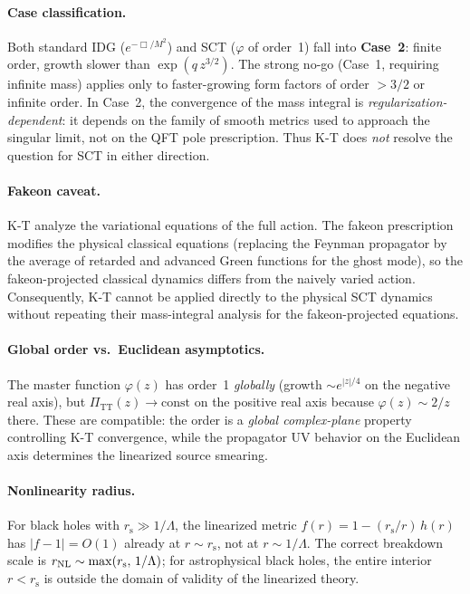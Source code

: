 \documentclass[11pt,a4paper]{article}
\theoremstyle{definition}
\theoremstyle{remark}
\newcommand{\Lam}{\Lambda}
\newcommand{\PiTT}{\Pi_{\mathrm{TT}}}
\newcommand{\rs}{r_{\mathrm{s}}}
\begin{document}
\paragraph{Case classification.}
Both standard IDG ($e^{-\Box/M^2}$) and SCT ($\varphi$ of order~1) fall into
\textbf{Case~2}: finite order, growth slower than $\exp(q\,z^{3/2})$.  The strong
no-go (Case~1, requiring infinite mass) applies only to faster-growing form factors
of order ${}>3/2$ or infinite order.  In Case~2, the convergence of the mass integral
is \emph{regularization-dependent}: it depends on the family of smooth metrics used
to approach the singular limit, not on the QFT pole prescription.  Thus K-T does
\emph{not} resolve the question for SCT in either direction.

\paragraph{Fakeon caveat.}
K-T analyze the variational equations of the full action.  The fakeon prescription
modifies the physical classical equations (replacing the Feynman propagator by the
average of retarded and advanced Green functions for the ghost mode), so the
fakeon-projected classical dynamics differs from the naively varied action.
Consequently, K-T cannot be applied directly to the physical SCT dynamics without
repeating their mass-integral analysis for the fakeon-projected equations.

\paragraph{Global order vs.\ Euclidean asymptotics.}
The master function $\varphi(z)$ has order~1 \emph{globally} (growth $\sim e^{|z|/4}$
on the negative real axis), but $\PiTT(z) \to \mathrm{const}$ on the positive real
axis because $\varphi(z) \sim 2/z$ there.  These are compatible: the order is a
\emph{global complex-plane} property controlling K-T convergence, while the propagator
UV behavior on the Euclidean axis determines the linearized source smearing.

\paragraph{Nonlinearity radius.}
For black holes with $\rs \gg 1/\Lam$, the linearized metric $f(r) = 1 - (\rs/r)\,h(r)$
has $|f - 1| = O(1)$ already at $r \sim \rs$, not at $r \sim 1/\Lam$.  The correct
breakdown scale is $r_{\rm NL} \sim \max(\rs,\, 1/\Lam)$; for astrophysical black holes,
the entire interior $r < \rs$ is outside the domain of validity of the linearized theory.
\end{document}
